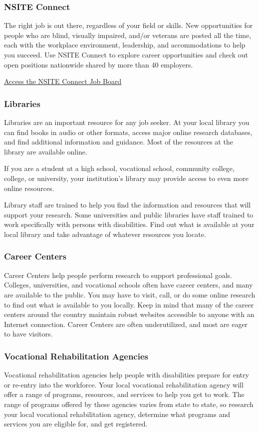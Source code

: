 \subsubsection*{NSITE Connect}
The right job is out there, regardless of your field or skills. New opportunities for people who are blind, visually impaired, and/or veterans are posted all the time, each with the workplace environment, leadership, and accommodations to help you succeed. Use NSITE Connect to explore career opportunities and check out open positions nationwide shared by more than 40 employers. 

\href{https://nsiteconnect.jobboard.io/}{Access the NSITE Connect Job Board}
\subsubsection*{Libraries}

Libraries are an important resource for any job seeker. At your local library you can find books in audio or other formats, access major online research databases, and find additional information and guidance. Most of the resources at the library are available online.

If you are a student at a high school, vocational school, community college, college, or university, your institution's library may provide access to even more online resources.

Library staff are trained to help you find the information and resources that will support your research. Some universities and public libraries have staff trained to work specifically with persons with disabilities. Find out what is available at your local library and take advantage of whatever resources you locate.

\subsubsection*{Career Centers}
Career Centers help people perform research to support professional goals. Colleges, universities, and vocational schools often have career centers, and many are available to the public. You may have to visit, call, or do some online research to find out what is available to you locally. Keep in mind that many of the career centers around the country maintain robust websites accessible to anyone with an Internet connection.
Career Centers are often underutilized, and most are eager to have visitors.

\subsubsection*{Vocational Rehabilitation Agencies}
Vocational rehabilitation agencies help people with disabilities prepare for entry or re-entry into the workforce. Your local vocational rehabilitation agency will offer a range of programs, resources, and services to help you get to work. The range of programs offered by these agencies varies from state to state, so research your local vocational rehabilitation agency, determine what programs and services you are eligible for, and get registered.

